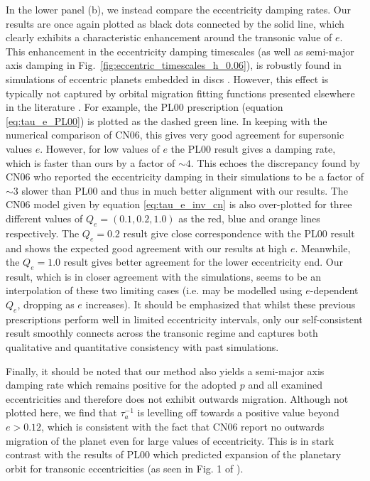 In the lower panel (b), we instead compare the eccentricity damping rates. Our results are once again plotted as black dots connected by the solid line, which clearly exhibits a characteristic enhancement around the transonic value of $e$. This enhancement in the eccentricity damping timescales (as well as semi-major axis damping in Fig.~\ref{fig:eccentric_timescales_h_0.06}), is robustly found in simulations of eccentric planets embedded in discs \citep[e.g. CN06,][]{Cresswell2007}. However, this effect is typically not captured by orbital migration fitting functions presented elsewhere in the literature \citep{IdaEtAl_2020}. For example, the PL00 prescription (equation \eqref{eq:tau_e_PL00}) is plotted as the dashed green line. In keeping with the numerical comparison of CN06, this gives very good agreement for supersonic values $e$. However, for low values of $e$ the PL00 result gives a damping rate, which is faster than ours by a factor of $\sim 4$. This echoes the discrepancy found by CN06 who reported the eccentricity damping in their simulations to be a factor of $\sim 3$ slower than PL00 and thus in much better alignment with our results. The CN06 model given by equation \eqref{eq:tau_e_inv_cn} is also over-plotted for three different values of $Q_{e} = (0.1,0.2,1.0)$ as the red, blue and orange lines respectively. The $Q_e = 0.2$ result give close correspondence with the PL00 result and shows the expected good agreement with our results at high $e$. Meanwhile, the $Q_e = 1.0$ result gives better agreement for the lower eccentricity end. Our result, which is in closer agreement with the simulations, seems to be an interpolation of these two limiting cases (i.e. may be modelled using $e$-dependent $Q_e$, dropping as $e$ increases). It should be emphasized that whilst these previous prescriptions perform well in limited eccentricity intervals, only our self-consistent result smoothly connects across the transonic regime and captures both qualitative and quantitative consistency with past simulations.

Finally, it should be noted that our method also yields a semi-major axis damping rate which remains positive for the adopted $p$ and all examined eccentricities and therefore does not exhibit outwards migration. Although not plotted here, we find that $\tau_a^{-1}$ is levelling off towards a positive value beyond $e>0.12$, which is consistent with the fact that CN06 report no outwards migration of the planet even for large values of eccentricity. This is in stark contrast with the results of PL00 which predicted expansion of the planetary orbit for transonic eccentricities (as seen in Fig. 1 of \cite{IdaEtAl_2020}).


